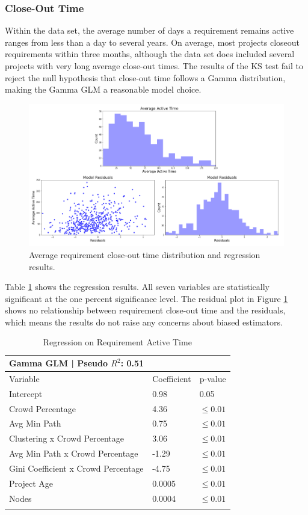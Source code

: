 \subsubsection{Close-Out Time}

Within the data set, the average number of days a requirement remains active ranges from less than a day to several years. On average, most projects closeout requirements within three months, although the data set does included several projects with very long average close-out times. The results of the KS test fail to reject the null hypothesis that close-out time follows a Gamma distribution, making the Gamma GLM a reasonable model choice.

\begin{figure}
  \includegraphics[width=.95\textwidth]{active_time_results.PNG}
\caption{Average requirement close-out time distribution and regression results.}
\label{active_time_results}
\end{figure}

Table \ref{active_time_regression} shows the regression results. All seven variables are statistically significant at the one percent significance level. The residual plot in Figure \ref{active_time_results} shows no relationship between requirement close-out time and the residuals, which means the results do not raise any concerns about biased estimators.

\begin{table}
\caption{Regression on Requirement Active Time}
\label{active_time_regression}
\begin{tabular}{lll}
Gamma GLM | Pseudo $R^2$: 0.51 \\
\hline\noalign{\smallskip}
Variable & Coefficient & p-value  \\
\noalign{\smallskip}\hline\noalign{\smallskip}
Intercept & 0.98 & 0.05 \\
Crowd Percentage & 4.36 & $\leq 0.01$  \\
Avg Min Path & 0.75 & $\leq 0.01$ \\
Clustering x Crowd Percentage & 3.06 & $\leq 0.01$ \\
Avg Min Path x Crowd Percentage & -1.29 & $\leq 0.01$ \\
Gini Coefficient x Crowd Percentage & -4.75 & $\leq 0.01$ \\
Project Age & 0.0005 & $\leq 0.01$ \\
Nodes & 0.0004 & $\leq 0.01$ \\
\noalign{\smallskip}\hline
\end{tabular}
\end{table}

